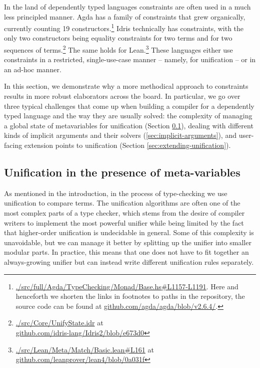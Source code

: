 In the land of dependently typed languages constraints are often used in
a much less principled manner. Agda has a family of constraints that
grew organically, currently counting 19 constructors.\footnote{\href{https://github.com/agda/agda/blob/v2.6.4/src/full/Agda/TypeChecking/Monad/Base.hs\#L1157-L1191}{./src/full/Agda/TypeChecking/Monad/Base.hs\#L1157-L1191}.
  Here and henceforth we shorten the links in footnotes to paths in the
  repository, the source code can be found at
  \href{https://github.com/agda/agda/blob/v2.6.4/}{github.com/agda/agda/blob/v2.6.4/}.}
Idris technically has constraints, with the only two constructors being
equality constraints for two terms and for two sequences of
terms.\footnote{\href{https://github.com/idris-lang/Idris2/blob/e673d05a67b82591131e35ccd50fc234fb9aed85/src/Core/UnifyState.idr}{./src/Core/UnifyState.idr}
  at\\
  \href{https://github.com/idris-lang/Idris2/blob/e673d05a67b82591131e35ccd50fc234fb9aed85}{github.com/idris-lang/Idris2/blob/e673d0}}
The same holds for Lean.\footnote{\href{https://github.com/leanprover/lean4/blob/0a031fc9bbb43c274bb400f121b13711e803f56c/src/Lean/Meta/Match/Basic.lean\#L161}{./src/Lean/Meta/Match/Basic.lean\#L161}
  at\\
  \href{https://github.com/leanprover/lean4/blob/0a031fc9bbb43c274bb400f121b13711e803f56c/}{github.com/leanprover/lean4/blob/0a031f}}
These languages either use constraints in a restricted, single-use-case
manner -- namely, for unification -- or in an ad-hoc manner.

In this section, we demonstrate why a more methodical approach to
constraints results in more robust elaborators across the board. In
particular, we go over three typical challenges that come up when
building a compiler for a dependently typed language and the way they
are usually solved: the complexity of managing a global state of
metavariables for unification (Section \ref{sec:conversion_checking}),
dealing with different kinds of implicit arguments and their solvers
(\ref{sec:implicit-arguments}), and user-facing extension points to
unification (Section \ref{sec:extending-unification}).

\hypertarget{sec:conversion_checking}{%
\subsection{Unification in the presence of
meta-variables}\label{sec:conversion_checking}}

As mentioned in the introduction, in the process of type-checking we use
unification to compare terms. The unification algorithms are often one
of the most complex parts of a type checker, which stems from the desire
of compiler writers to implement the most powerful unifier while being
limited by the fact that higher-order unification is undecidable in
general. Some of this complexity is unavoidable, but we can manage it
better by splitting up the unifier into smaller modular parts. In
practice, this means that one does not have to fit together an
always-growing unifier but can instead write different unification rules
separately.

